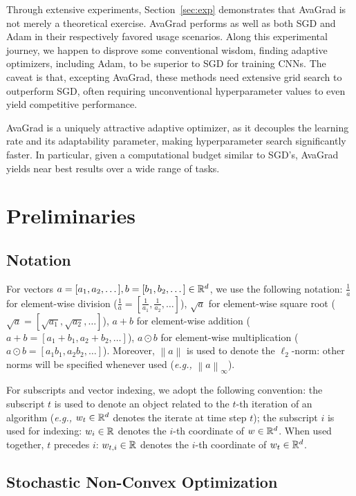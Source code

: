 \documentclass{article}
\newcommand{\eg}{\textit{e.g.,} }
\newcommand{\currw}{w_t}
\newcommand{\wi}{w_i}
\newcommand{\currwi}{w_{t,i}}
\newcommand{\w}{w}
\newcommand{\normed}[1]{\left\lVert {#1} \right\rVert}
\begin{document}
\pagebreak

Through extensive experiments, Section~\ref{sec:exp} demonstrates that AvaGrad
is not merely a theoretical exercise.  AvaGrad performs as well as both SGD and
Adam in their respectively favored usage scenarios.  Along this experimental
journey, we happen to disprove some conventional wisdom, finding adaptive
optimizers, including Adam, to be superior to SGD for training CNNs.  The
caveat is that, excepting AvaGrad, these methods need extensive grid search to outperform SGD, often requiring unconventional hyperparameter values to even yield competitive performance.

AvaGrad is a uniquely attractive adaptive optimizer, as it decouples the learning rate and its adaptability parameter, making hyperparameter search significantly faster. In particular, given a computational budget similar to SGD's, AvaGrad yields near best results over a wide range of tasks. 
 \section{Preliminaries}
\label{sec:prelim}

\subsection{Notation}

For vectors $a = [a_1, a_2, \dots], b = [b_1, b_2, \dots] \in \mathbb{R}^d$, we use the
following notation:
   $\frac1{a}$ for element-wise division
      ($\frac1{a} = [\frac1{a_1}, \frac1{a_2}, \dots]$),
   $\sqrt a$ for element-wise square root
      ($\sqrt a = [\sqrt{a_1}, \sqrt{a_2}, \dots]$),
   $a + b$ for element-wise addition
      ($a+b = [a_1+b_1, a_2+b_2, \dots]$),
   $a \odot b$ for element-wise multiplication
      ($a \odot b = [a_1 b_1, a_2 b_2, \dots]$).
Moreover, $\normed{a}$ is used to denote the $\ell_2$-norm: other norms will be
specified whenever used (\eg $\normed{a}_\infty$).

For subscripts and vector indexing, we adopt the following convention: the
subscript $t$ is used to denote an object related to the $t$-th iteration of an
algorithm (\eg $\currw \in \R^d$ denotes the iterate at time step $t$); the
subscript $i$ is used for indexing: $\wi \in \R$ denotes the $i$-th coordinate
of $\w \in \R^d$.  When used together, $t$ precedes $i$: $\currwi \in \R$
denotes the $i$-th coordinate of $\currw \in \R^d$.

\subsection{Stochastic Non-Convex Optimization}
\end{document}
